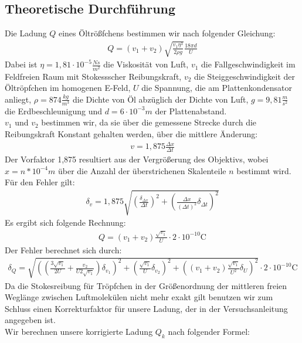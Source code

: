 \documentclass[12pt]{scrartcl}
\begin{document}
\subsection{Theoretische Durchführung}
Die Ladung $Q$ eines Öltrößfchens bestimmen wir nach folgender Gleichung:
\begin{align}
Q = (v_1+v_2)\sqrt{\frac{v_1 \eta^3}{2\rho g}} \frac{18 \pi d}{U}
\end{align}
Dabei ist $\eta = 1,81\cdot10^{-5}\frac{Ns}{m^2}$ die Viskosität von Luft, $v_1$ die Fallgeschwindigkeit im Feldfreien Raum mit Stokessscher Reibungskraft, $v_2$ die Steiggeschwindigkeit der Öltröpfchen im homogenen E-Feld, $U$ die Spannung, die am Plattenkondensator anliegt, $\rho = 874 \frac{kg}{m^3}$ die Dichte von Öl abzüglich der Dichte von Luft, $g = 9,81 \frac{m}{s^2}$ die Erdbeschleunigung und $ d = 6\cdot10^{-3} m$ der Plattenabstand.\\
$v_1$ und $v_2$ bestimmen wir, da sie über die gemessene Strecke durch die Reibungskraft Konstant gehalten werden, über die mittlere Änderung:
\begin{align}
v = 1,875\frac{\Delta x}{\Delta t}
\end{align}
Der Vorfaktor 1,875 resultiert aus der Vergrößerung des Objektivs, wobei $x = n*10^{-4}m$ über die Anzahl der überstrichenen Skalenteile $n$ bestimmt wird.\\
Für den Fehler gilt:
\begin{align}
\delta_v = 1,875 \sqrt{
\left(\frac{\delta_{\Delta x}}{\Delta t}\right)^2+
\left(\frac{\Delta x}{(\Delta t)^2}\delta_{\Delta t}\right)^2}
\end{align}
Es ergibt sich folgende Rechnung:
\begin{align}
Q = (v_1+v_2)\frac{\sqrt{v_1}}{U}\cdot2\cdot10^{-10} \text{C}
\label{eqn:q}
\end{align}
Der Fehler berechnet sich durch:
\begin{align}
\delta_Q = \sqrt{
\left(\left(\frac{3 \sqrt{v_1}}{2 U} + \frac{v_2}{U2\sqrt{v_1}}
\right)\delta_{v_1}\right)^2+
\left(\frac{\sqrt{v_1}}{U}\delta_{v_2}\right)^2+
\left((v_1+v_2)\frac{\sqrt{v_1}}{U^2}\delta_{U}\right)^2}
\cdot2\cdot10^{-10}\text{C}
\label{eqn:q_sigma}
\end{align}
Da die Stokesreibung für Tröpfchen in der Größenordnung der mittleren freien Weglänge zwischen Luftmolekülen nicht mehr exakt gilt benutzen wir zum Schluss einen Korrekturfaktor für unsere Ladung, der in der Versuchsanleitung angegeben ist.\\
Wir berechnen unsere korrigierte Ladung $Q_k$ nach folgender Formel:
\end{document}

